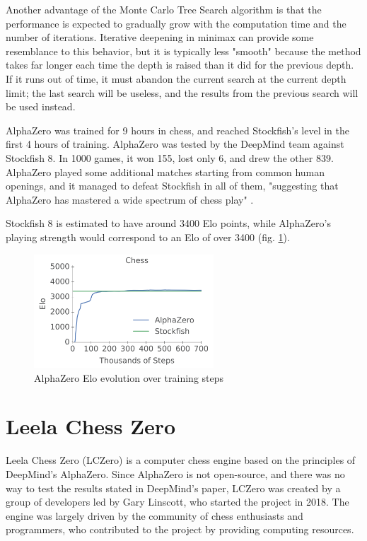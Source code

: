 Another advantage of the Monte Carlo Tree Search algorithm is that the performance is expected to gradually grow with the computation time and the number of iterations. Iterative deepening in minimax can provide some resemblance to this behavior, but it is typically less "smooth" because the method takes far longer each time the depth is raised than it did for the previous depth. If it runs out of time, it must abandon the current search at the current depth limit; the last search will be useless, and the results from the previous search will be used instead.

AlphaZero was trained for 9 hours in chess, and reached Stockfish's level in the first 4 hours of training. AlphaZero was tested by the DeepMind team against Stockfish 8. In 1000 games, it won 155, lost only 6, and drew the other 839. AlphaZero played some additional matches starting from common human openings, and it managed to defeat Stockfish in all of them, "suggesting that AlphaZero has mastered a wide spectrum of chess play" \cite{silver2018general}.

Stockfish 8 is estimated to have around 3400 Elo points, while AlphaZero's playing strength would correspond to an Elo of over 3400 (fig. \ref{fig:alphaZeroEloEvolution}).

\begin{figure}[h]
    \centering
    \includegraphics[width=0.6\textwidth]{figures/alpha-zero-elo-evolution.png}
    \caption{AlphaZero Elo evolution over training steps \cite{silver2018general}}
    \label{fig:alphaZeroEloEvolution}
\end{figure}

\section{Leela Chess Zero}
\label{sec:ch3sec5}

Leela Chess Zero (LCZero) is a computer chess engine based on the principles of DeepMind's AlphaZero. Since AlphaZero is not open-source, and there was no way to test the results stated in DeepMind's paper, LCZero was created by a group of developers led by Gary Linscott, who started the project in 2018. The engine was largely driven by the community of chess enthusiasts and programmers, who contributed to the project by providing computing resources.

